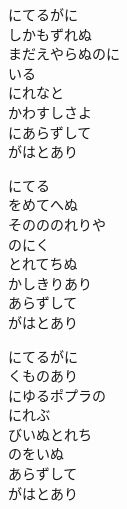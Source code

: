 \documentclass[10pt,b5j]{tarticle} %
\begin{document}
\vspace{1.5em} %
\newcommand{\linespace}{0.5em} %
\newcommand{\blocksize}{0.5\hsize} %
\begin{enumerate} %
    \begin{minipage}[c]{\blocksize}
    
        \vspace{\linespace}
        \item
        にてるがに\\
        しかもずれぬ\\
        まだえやらぬのに\\
        いる\\
        にれなと\\
        かわすしさよ\\
        にあらずして\\
        がはとあり
        
        \vspace{\linespace}
        \item
        にてる\\
        をめてへぬ\\
        そのののれりや\\
        のにく\\
        とれてちぬ\\
        かしきりあり\\
        あらずして\\
        がはとあり
        
        \vspace{\linespace}
        \item
        にてるがに\\
        くものあり\\
        にゆるポプラの\\
        にれぶ\\
        びいぬとれち\\
        のをいぬ\\
        あらずして\\
        がはとあり
        

\end{minipage}
\end{enumerate}
\end{document}
